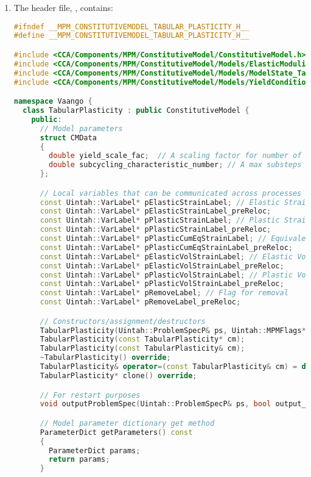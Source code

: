 \begin{enumerate}
  \item The header file, , contains:
\begin{lstlisting}[language=Cpp]
#ifndef __MPM_CONSTITUTIVEMODEL_TABULAR_PLASTICITY_H__
#define __MPM_CONSTITUTIVEMODEL_TABULAR_PLASTICITY_H__

#include <CCA/Components/MPM/ConstitutiveModel/ConstitutiveModel.h>
#include <CCA/Components/MPM/ConstitutiveModel/Models/ElasticModuliModel.h>
#include <CCA/Components/MPM/ConstitutiveModel/Models/ModelState_Tabular.h>
#include <CCA/Components/MPM/ConstitutiveModel/Models/YieldCondition.h>

namespace Vaango {
  class TabularPlasticity : public ConstitutiveModel {
    public:
      // Model parameters
      struct CMData
      {
        double yield_scale_fac;  // A scaling factor for number of substeps
        double subcycling_characteristic_number; // A max substeps value
      };

      // Local variables that can be communicated across processes
      const Uintah::VarLabel* pElasticStrainLabel; // Elastic Strain
      const Uintah::VarLabel* pElasticStrainLabel_preReloc;
      const Uintah::VarLabel* pPlasticStrainLabel; // Plastic Strain
      const Uintah::VarLabel* pPlasticStrainLabel_preReloc;
      const Uintah::VarLabel* pPlasticCumEqStrainLabel; // Equivalent plastic strain
      const Uintah::VarLabel* pPlasticCumEqStrainLabel_preReloc;
      const Uintah::VarLabel* pElasticVolStrainLabel; // Elastic Volumetric Strain
      const Uintah::VarLabel* pElasticVolStrainLabel_preReloc;
      const Uintah::VarLabel* pPlasticVolStrainLabel; // Plastic Volumetric Strain
      const Uintah::VarLabel* pPlasticVolStrainLabel_preReloc;
      const Uintah::VarLabel* pRemoveLabel; // Flag for removal
      const Uintah::VarLabel* pRemoveLabel_preReloc;

      // Constructors/assignment/destructors
      TabularPlasticity(Uintah::ProblemSpecP& ps, Uintah::MPMFlags* flag);
      TabularPlasticity(const TabularPlasticity* cm);
      TabularPlasticity(const TabularPlasticity& cm);
      ~TabularPlasticity() override;
      TabularPlasticity& operator=(const TabularPlasticity& cm) = delete;
      TabularPlasticity* clone() override;

      // For restart purposes
      void outputProblemSpec(Uintah::ProblemSpecP& ps, bool output_cm_tag = true) override;

      // Model parameter dictionary get method
      ParameterDict getParameters() const
      {
        ParameterDict params;
        return params;
      }


\end{lstlisting}
\end{enumerate}
